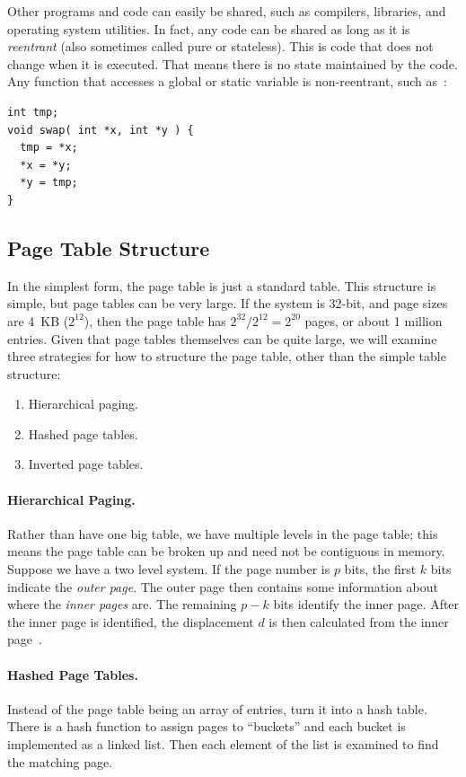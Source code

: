 Other programs and code can easily be shared, such as compilers, libraries, and operating system utilities. In fact, any code can be shared as long as it is \textit{reentrant} (also sometimes called pure or stateless). This is code that does not change when it is executed. That means there is no state maintained by the code. Any function that accesses a global or static variable is non-reentrant, such as~\cite{mte241}:

\begin{verbatim}
int tmp;
void swap( int *x, int *y ) {
  tmp = *x;
  *x = *y;
  *y = tmp; 
}
\end{verbatim}

\subsection*{Page Table Structure}
In the simplest form, the page table is just a standard table. This structure is simple, but page tables can be very large. If the system is 32-bit, and page sizes are 4~KB ($2^{12}$), then the page table has $2^{32}/2^{12} = 2^{20}$ pages, or about 1 million entries. Given that page tables themselves can be quite large, we will examine three strategies for how to structure the page table, other than the simple table structure:

\begin{enumerate}
	\item Hierarchical paging.
	\item Hashed page tables.
	\item Inverted page tables.
\end{enumerate}

\paragraph{Hierarchical Paging.}
Rather than have one big table, we have multiple levels in the page table; this means the page table can be broken up and need not be contiguous in memory. Suppose we have a two level system. If the page number is $p$ bits, the first $k$ bits indicate the \textit{outer page}. The outer page then contains some information about where the \textit{inner pages} are. The remaining $p-k$ bits identify the inner page. After the inner page is identified, the displacement $d$ is then calculated from the inner page~\cite{osc}.

\paragraph{Hashed Page Tables.} 
Instead of the page table being an array of entries, turn it into a hash table. There is a hash function to assign pages to ``buckets'' and each bucket is implemented as a linked list. Then each element of the list is examined to find the matching page.

